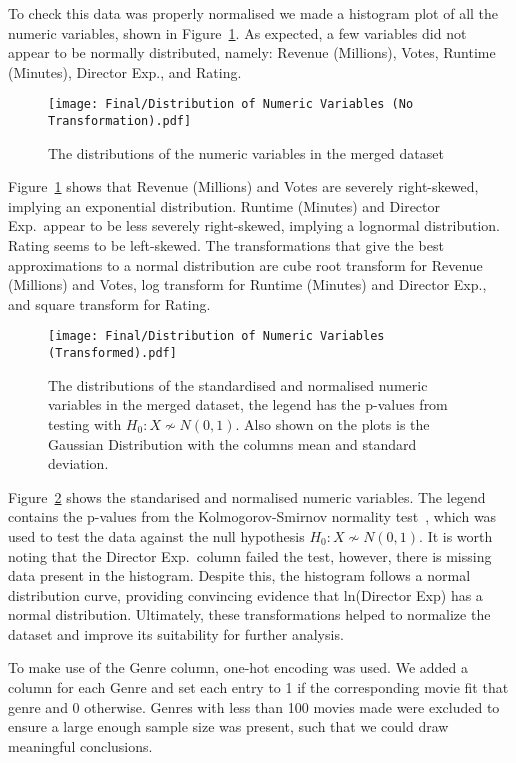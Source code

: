         To check this data was properly normalised we made a histogram plot of all the
            numeric variables, shown in Figure~\ref{fig-distribution-of-numeric-variable}.
        As expected, a few variables did not appear to be normally distributed, namely:
        Revenue (Millions), Votes, Runtime (Minutes), Director Exp., and Rating.
        \begin{figure}[H]
            \centering
            \texttt{[image: Final/Distribution of Numeric Variables (No Transformation).pdf]}
            \caption[short]{The distributions of the numeric variables in the merged dataset}\label{fig-distribution-of-numeric-variable}
        \end{figure}
        Figure~\ref{fig-distribution-of-numeric-variable} shows that Revenue (Millions)
            and Votes are severely right-skewed, implying an exponential distribution.
        Runtime (Minutes) and Director Exp.~appear to be less severely right-skewed,
            implying a lognormal distribution.
        Rating seems to be left-skewed.
        The transformations that give the best approximations to a normal distribution
            are cube root transform for Revenue (Millions) and Votes, log transform for
            Runtime (Minutes) and Director Exp., and square transform for Rating.
        \begin{figure}[H]
            \centering
            \texttt{[image: Final/Distribution of Numeric Variables (Transformed).pdf]}
            \caption[short]{
                The distributions of the standardised and normalised numeric variables in the merged dataset,
                the legend has the p-values from testing with $H_{0}: X \not\sim N(0,1)$.
                Also shown on the plots is the Gaussian Distribution with the columns mean and
                    standard deviation.
            }\label{fig-transformed-distribution-of-numeric-variable}
        \end{figure}
        Figure~\ref{fig-transformed-distribution-of-numeric-variable} shows the
            standarised and normalised numeric variables.
        The legend contains the p-values from the Kolmogorov-Smirnov normality
            test~\cite{KStest}, which was used to test the data against the null hypothesis
            $H_{0}: X \not\sim N(0,1)$.
        It is worth noting that the Director Exp.~column failed the test, however,
            there is missing data present in the histogram.
        Despite this, the histogram follows a normal distribution curve, providing
            convincing evidence that ln(Director Exp) has a normal distribution.
        Ultimately, these transformations helped to normalize the dataset and improve
            its suitability for further analysis.

        To make use of the Genre column, one-hot encoding was used.
        We added a column for each Genre and set each entry to 1 if the corresponding
            movie fit that genre and 0 otherwise.
        Genres with less than 100 movies made were excluded to ensure a large enough
            sample size was present, such that we could draw meaningful conclusions.
